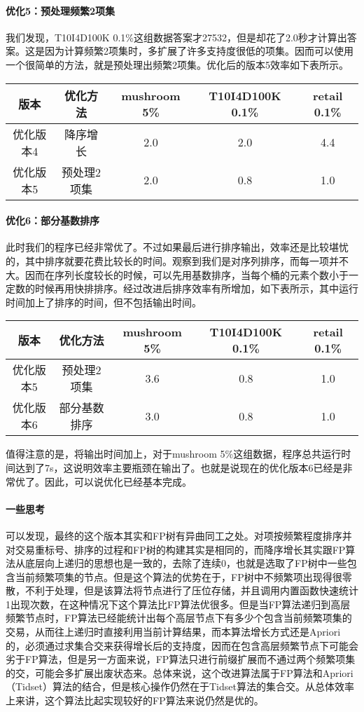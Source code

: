 \documentclass[a4paper,9pt]{article}
\begin{document}
\paragraph{优化5：预处理频繁2项集} 我们发现，T10I4D100K 0.1\%这组数据答案才27532，但是却花了2.0秒才计算出答案。这是因为计算频繁2项集时，多扩展了许多支持度很低的项集。因而可以使用一个很简单的方法，就是预处理出频繁2项集。优化后的版本5效率如下表所示。
\begin{center}
	\begin{tabular}{ccccc}
		版本&优化方法&mushroom 5\%&T10I4D100K 0.1\%&retail 0.1\%\\\hline
		优化版本4&降序增长&2.0&2.0&4.4\\
		优化版本5&预处理2项集&2.0&0.8&1.0
	\end{tabular}
\end{center}

\paragraph{优化6：部分基数排序} 此时我们的程序已经非常优了。不过如果最后进行排序输出，效率还是比较堪忧的，其中排序就要花费比较长的时间。观察到我们是对序列排序，而每一项并不大。因而在序列长度较长的时候，可以先用基数排序，当每个桶的元素个数小于一定数的时候再用快排排序。经过改进后排序效率有所增加，如下表所示，其中运行时间加上了排序的时间，但不包括输出时间。
\begin{center}
	\begin{tabular}{ccccc}
		版本&优化方法&mushroom 5\%&T10I4D100K 0.1\%&retail 0.1\%\\\hline
		优化版本5&预处理2项集&3.6&0.8&1.0\\
		优化版本6&部分基数排序&3.0&0.8&1.0
	\end{tabular}
\end{center}
值得注意的是，将输出时间加上，对于mushroom 5\%这组数据，程序总共运行时间达到了7s，这说明效率主要瓶颈在输出了。也就是说现在的优化版本6已经是非常优了。因此，可以说优化已经基本完成。

\paragraph{一些思考} 可以发现，最终的这个版本其实和FP树有异曲同工之处。对项按频繁程度排序并对交易重标号、排序的过程和FP树的构建其实是相同的，而降序增长其实跟FP算法从底层向上递归的思想也是一致的，去除了连续0，也就是选取了FP树中一些包含当前频繁项集的节点。但是这个算法的优势在于，FP树中不频繁项出现得很零散，不利于处理，但是该算法将节点进行了压位存储，并且调用内置函数快速统计1出现次数，在这种情况下这个算法比FP算法优很多。但是当FP算法递归到高层频繁节点时，FP算法已经能统计出每个高层节点下有多少个包含当前频繁项集的交易，从而往上递归时直接利用当前计算结果，而本算法增长方式还是Apriori的，必须通过求集合交来获得增长后的支持度，因而在包含高层频繁节点下可能会劣于FP算法，但是另一方面来说，FP算法只进行前缀扩展而不通过两个频繁项集的交，可能会多扩展出废状态来。总体来说，这个改进算法属于FP算法和Apriori（Tidset）算法的结合，但是核心操作仍然在于Tidset算法的集合交。从总体效率上来讲，这个算法比起实现较好的FP算法来说仍然是优的。
\end{document}

